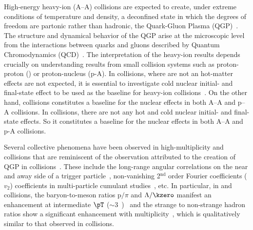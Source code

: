 \documentclass[ALICE,manyauthors]{cernphprep}
\begin{document}
High-energy heavy-ion (A--A) collisions are expected to create, under extreme conditions of temperature and density, a deconfined state in which the degrees of freedom are partonic rather than hadronic, the Quark-Gluon Plasma (QGP)~\cite{Rafelski:126179, Satz:2000bn, Shuryak:1983ni, Jacak:2012dx, Cleymans:1985wb, Bass:1998vz, BraunMunzinger:2007zz}.
The structure and dynamical behavior of the QGP arise at the microscopic level from the interactions between quarks and gluons described by Quantum Chromodynamics (QCD)~\cite{Laermann:2003cv, Gupta:2011wh, Bhattacharya:2014ara}.
The interpretation of the heavy-ion results depends crucially on understanding results from small collision systems such as proton-proton (\pp) or proton-nucleus (p-A).
In \pPb collisions, where are not an hot-matter effects are not expected, it is essential to investigate cold nuclear initial- and final-state effect to be used as the baseline for heavy-ion collisions~\cite{Salgado:2011wc, Eskola:2016oht}.
On the other hand, \pp collisions constitutes a baseline for the nuclear effects in both A--A and p--A collisions.
In \pp collisions, there are not any hot and cold nuclear initial- and final-state effects.
So it constitutes a baseline for the nuclear effects in both A--A and p-A collisions.

Several collective phenomena have been observed in high-multiplicity \pp and \pPb collisions that are reminiscent of the observation attributed to the creation of QGP in \PbPb collisions~\cite{Aad:2015gqa, Abelev:2012ola, ABELEV:2013wsa, Khachatryan:2015waa, Acharya:2019vdf, Abelev:2014uua, Adam:2015vsf}.
These include the long-range angular correlations on the near and away side of a trigger particle~\cite{Aad:2015gqa, Abelev:2012ola, ABELEV:2013wsa}, non-vanishing 2$^\mathrm{nd}$ order Fourier coefficients ($v_{2}$) coefficients in multi-particle cumulant studies~\cite{Acharya:2019vdf, Khachatryan:2015waa}, etc.
In particular, in \pp and \pPb collisions, the baryon-to-meson ratios p$/\pi$ and $\Lambda/\kzero$ manifest an enhancement at intermediate $\pT$ ($\sim 3$~\GeVc)~\cite{Acharya:2018orn, Khachatryan:2016yru, Abelev:2013xaa, ALICE:2017jyt} and the strange to non-strange hadron ratios show a significant enhancement with multiplicity~\cite{Abelev:2013haa, ALICE:2017jyt, Khachatryan:2016yru}, which is qualitatively similar to that observed in \PbPb collisions.
\end{document}
